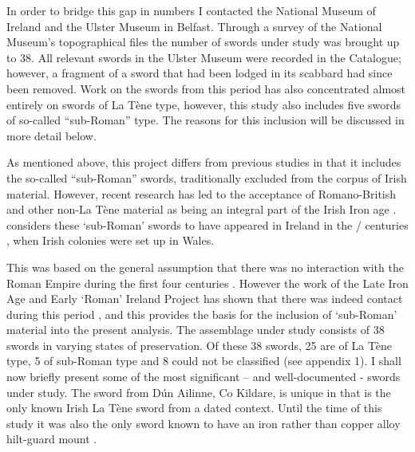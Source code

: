In order to bridge this gap in numbers I contacted the National Museum of Ireland and the Ulster Museum in Belfast. 
Through a survey of the National Museum’s topographical files the number of swords under study was brought up to \num{38}. 
All relevant swords in the Ulster Museum were recorded in the Catalogue; 
however, a fragment of a sword that had been lodged in its scabbard had since been removed. 
Work on the swords from this period has also concentrated almost entirely on swords of La Tène type, however, this study also includes five swords of so-called “sub-Roman” type. 
The reasons for this inclusion will be discussed in more detail below.


As mentioned above, this project differs from previous studies in that it includes the so-called “sub-Roman” swords, traditionally excluded from the corpus of Irish material. However, recent research has led to the acceptance of Romano-British and other non-La Tène material as being an integral part of the Irish Iron age 
. 
\textcite[95]{Rynne1982} considers these ‘sub-Roman’ swords to have appeared in Ireland in the / centuries \AD, 
when Irish colonies were set up in Wales.

This was based on the general assumption that there was no interaction with the Roman Empire during the first four centuries \AD. 
However the work of the Late Iron Age and Early ‘Roman’ Ireland Project has shown that there was indeed contact during this period 
\parencite[esp. chapters 7--8]{CahillWilson2014}, 
and this provides the basis for the inclusion of ‘sub-Roman’ material into the present analysis. 
The assemblage under study consists of \num{38} swords in varying states of preservation. 
Of these \num{38} swords, \num{25} are of La Tène type, \num{5} of sub-Roman type and 8 could not be classified (see appendix 1). 
I shall now briefly present some of the most significant – and well-documented - swords under study. 
The sword from Dún Ailinne, Co Kildare, is unique in that is the only known Irish La Tène sword from a dated context. 
Until the time of this study it was also the only sword known to have an iron rather than copper alloy hilt-guard mount 
\parencite[88\psq]{Johnston2007}. 

